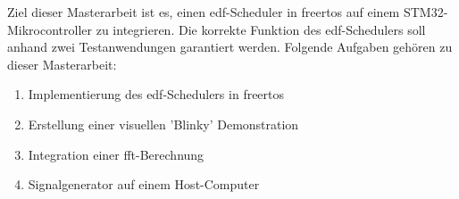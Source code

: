 \documentclass[../EDF Master Thesis.tex]{subfiles}
\begin{document}
    Ziel dieser Masterarbeit ist es, einen \ac{edf}-Scheduler in \ac{freertos} auf einem STM32-Mikrocontroller zu integrieren.
    Die korrekte Funktion des \ac{edf}-Schedulers soll anhand zwei Testanwendungen garantiert werden.
    Folgende Aufgaben gehören zu dieser Masterarbeit:
    \begin{enumerate}
        \item Implementierung des \ac{edf}-Schedulers in \ac{freertos}
        \item Erstellung einer visuellen 'Blinky' Demonstration
        \item Integration einer \ac{fft}-Berechnung
        \item Signalgenerator auf einem Host-Computer
    \end{enumerate}
\end{document}
